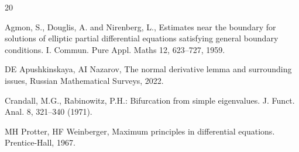 \documentclass[a4paper,reqno,12pt]{amsart}
\theoremstyle{plain}
\theoremstyle{definition}
\numberwithin{equation}{section}
\begin{document}
{\begin{thebibliography}{20}

 Agmon, S., Douglis, A. and Nirenberg, L., Estimates near the boundary for solutions of elliptic partial differential equations satisfying general boundary conditions. I. Commun. Pure
Appl. Maths 12, 623–727, 1959.


	
 DE Apushkinskaya, AI Nazarov,
The normal derivative lemma and surrounding issues,
Russian Mathematical Surveys, 2022.

 Crandall, M.G., Rabinowitz, P.H.: Bifurcation from simple eigenvalues. J. Funct. Anal. 8, 321–340 (1971).

 MH Protter, HF Weinberger,  Maximum principles in differential equations. Prentice-Hall, 1967.
















\end{thebibliography}}
\end{document}

